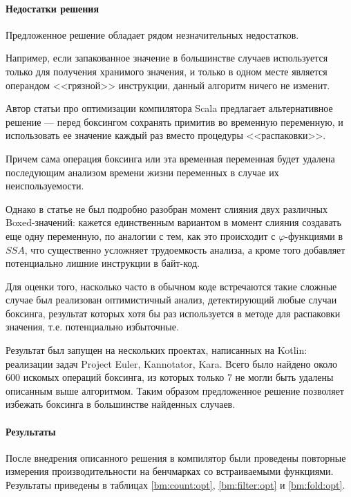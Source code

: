 \paragraph{Недостатки решения}
Предложенное решение обладает рядом незначительных недостатков.

Например, если запакованное значение в большинстве случаев используется только для получения
хранимого значения, и только в одном месте является операндом <<грязной>> инструкции, данный
алгоритм ничего не изменит.

Автор статьи про оптимизации компилятора Scala\cite{ScalaDragos} предлагает альтернативное
решение --- перед боксингом сохранять примитив во временную переменную, и использовать ее
значение каждый раз вместо процедуры <<распаковки>>.

Причем сама операция боксинга или эта временная переменная будет удалена последующим анализом
времени жизни переменных в случае их неиспользуемости.

Однако в статье не был подробно разобран момент слияния двух различных Boxed-значений:
кажется единственным вариантом в момент слияния создавать еще одну переменную, по аналогии с тем,
как это происходит с $\varphi$-функциями в $SSA$\cite{Muchnick}, что существенно усложняет
трудоемкость анализа, а кроме того добавляет потенциально лишние инструкции в байт-код.

Для оценки того, насколько часто в обычном коде встречаются такие сложные случае был реализован
оптимистичный анализ, детектирующий любые случаи боксинга, результат которых хотя бы раз
используется в методе для распаковки значения, т.е. потенциально избыточные.

Результат был запущен на нескольких проектах, написанных на Kotlin: реализации задач Project Euler,
Kannotator, Kara.
Всего было найдено около 600 искомых операций боксинга, из которых только 7 не могли быть удалены
описанным выше алгоритмом.
Таким образом предложенное решение позволяет избежать боксинга в большинстве найденных случаев.

\paragraph{Результаты}
После внедрения описанного решения в компилятор были проведены повторные измерения
производительности на бенчмарках со встраиваемыми функциями. Результаты приведены в таблицах
\ref{bm:count:opt}, \ref{bm:filter:opt} и \ref{bm:fold:opt}.

